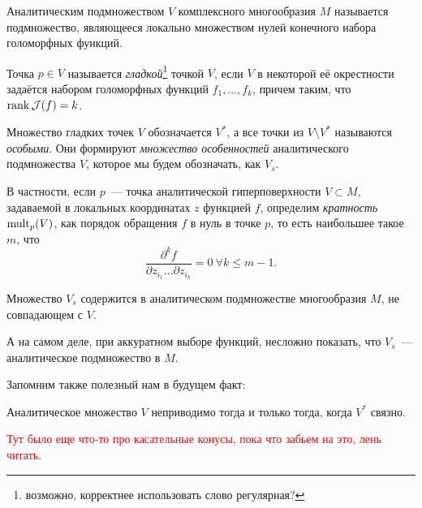     \begin{definition}
        Аналитическим подмножеством $V$ комплексного многообразия $M$ называется подмножество, являющееся локально множеством нулей конечного набора голоморфных функций.

       Точка $p \in V$ называется \emph{гладкой}\footnote{возможно, корректнее использовать слово регулярная?} точкой $V$, если $V$
        в некоторой её окрестности задаётся набором голоморфных функций $f_{1}, \ldots, f_{k}$, причем таким, что $\operatorname{rank}{\mathcal{J}(f)} = k$.

        Множество гладких точек $V$ обозначается $V^{*}$, а все точки из $V \setminus V^{*}$ называются \emph{особыми}.
        Они формируют \emph{множество особенностей} аналитического подмножества $V$, которое мы будем обозначать, как $V_{s}$.

        В частности, если $p$~--- точка аналитической гиперповерхности $V \subset M$, задаваемой в локальных координатах $z$ функцией $f$, определим \emph{кратность} $\operatorname{mult}_{p}(V)$, как
        порядок обращения $f$  в нуль в точке $p$, то есть наибольшее такое $m$, что
        \[ \frac{\partial^{k}f}{\partial z_{i_{1}} \ldots \partial z_{i_{k}}} = 0 \ \forall k \le m - 1. \]

    \end{definition}
    
    \begin{statement}
        Множество $V_{s}$ содержится в аналитическом подмножестве многообразия $M$, не совпадающем с $V$. 
    \end{statement}
    \begin{remark}
       А на самом деле, при аккуратном выборе функций, несложно показать, что $V_{s}$~--- аналитическое подмножество в $M$.
    \end{remark}   

    Запомним также полезный нам в будущем факт:

    \begin{statement}
        Аналитическое множество $V$ неприводимо тогда и только тогда, когда $V^{*}$ связно.
    \end{statement}

    \textcolor{red}{Тут было еще что-то про касательные конусы, пока что забьем на это, лень читать. }


    







